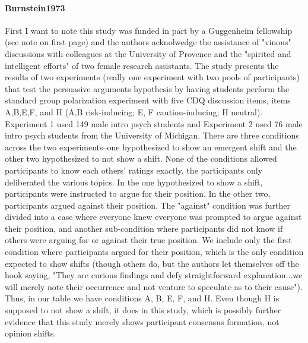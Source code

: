 \documentclass[12pt, letterpaper]{article}
\begin{document}
\paragraph{{Burnstein1973}} First I want to note this study was funded in part by a Guggenheim fellowship (see
note on first page) and the authors acknolwedge the assistance of "vinous" discussions with colleagues at the
University of Provence and the "spirited and intelligent efforts" of two female research assistants. The study
presents the results of two experiments (really one experiment with two pools of participants) that test the
persuasive arguments hypothesis by having students perform the standard group polarization experiment with five CDQ
discussion items, items A,B,E,F, and H (A,B risk-inducing; E, F caution-inducing; H neutral). Experiment 1 used 149
male intro psych students and Experiment 2 used 76 male intro psych students from the University of Michigan. There
are three conditions across the two experiments--one hypothesized to show an emergent shift and the other two
hypothesized to not show a shift. None of the conditions allowed participants to know each others' ratings exactly,
the participants only deliberated the various topics. In the one hypothesized to show a shift, participants were
instructed to argue for their position. In the other two, participants argued against their position. The "against"
condition was further divided into a case where everyone knew everyone was prompted to argue against their position,
and another sub-condition where participants did not know if others were arguing for or against their true position.
We include only the first condition where participants argued for their position, which is the only condition
expected to show shifts (though others do, but the authors let themselves off the hook saying, "They are curious
findings and defy straightforward explanation...we will merely note their occurrence and not venture to speculate as
to their cause"). Thus, in our table we have conditions A, B, E, F, and H. Even though H is supposed to not show a
shift, it does in this study, which is possibly further evidence that this study merely shows participant consensus
formation, not opinion shifts.
\end{document}
